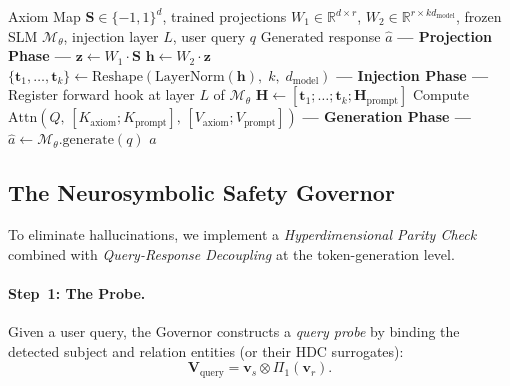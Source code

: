 \documentclass[11pt,a4paper]{article}
\begin{document}
\begin{algorithm}[t]
\caption{Zero-Retrieval Latent Priming}
\label{alg:priming}
\begin{algorithmic}[1]
\Require Axiom Map $\mathbf{S} \in \{-1,1\}^d$,
         trained projections $W_1 \in \mathbb{R}^{d \times r}$,
         $W_2 \in \mathbb{R}^{r \times k d_{\text{model}}}$,
         frozen SLM $\mathcal{M}_\theta$,
         injection layer $L$,
         user query $q$
\Ensure Generated response $\hat{a}$
\Statex \textbf{--- Projection Phase ---}
\State $\mathbf{z} \gets W_1 \cdot \mathbf{S}$
\State $\mathbf{h} \gets W_2 \cdot \mathbf{z}$
\State $\{\mathbf{t}_1, \ldots, \mathbf{t}_k\} \gets
       \text{Reshape}(\text{LayerNorm}(\mathbf{h}),\; k,\; d_{\text{model}})$
\Statex \textbf{--- Injection Phase ---}
\State Register forward hook at layer $L$ of $\mathcal{M}_\theta$
    \State $\mathbf{H} \gets [\mathbf{t}_1; \ldots; \mathbf{t}_k ;
           \mathbf{H}_{\text{prompt}}]$
    \State Compute $\text{Attn}(Q,\, [K_{\text{axiom}}; K_{\text{prompt}}],\,
           [V_{\text{axiom}}; V_{\text{prompt}}])$
\EndFor
\Statex \textbf{--- Generation Phase ---}
\State $\hat{a} \gets \mathcal{M}_\theta.\text{generate}(q)$
\State \Return $\hat{a}$
\end{algorithmic}
\end{algorithm}

\subsection{The Neurosymbolic Safety Governor}
\label{sec:governor}

To eliminate hallucinations, we implement a \emph{Hyperdimensional Parity
Check} combined with \emph{Query-Response Decoupling} at the
token-generation level.

\paragraph{Step~1: The Probe.}
Given a user query, the Governor constructs a \emph{query probe} by binding
the detected subject and relation entities (or their HDC surrogates):
\begin{equation}
    \mathbf{V}_{\text{query}} = \mathbf{v}_{s} \otimes
    \Pi_1(\mathbf{v}_{r}).
    \label{eq:probe}
\end{equation}
\end{document}
